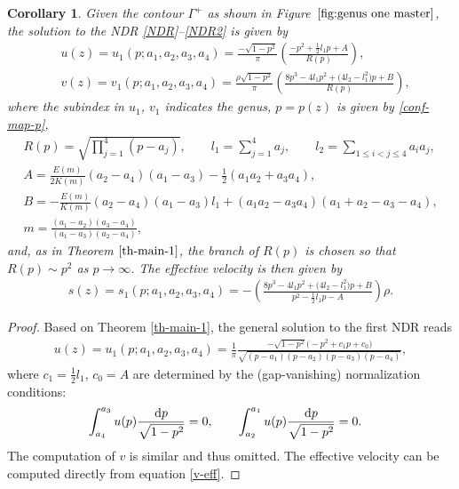 \documentclass[10pt,a4paper]{amsart}
\numberwithin{equation}{section}
\newtheorem{Corollary}[Theorem]{Corollary}
\def\ra{\rightarrow}
\newcommand{\G}{\Gamma}
\def\G{\Gamma}
\begin{document}
\begin{Corollary}
Given the contour $\G^+$ as shown in Figure~$\ref{fig:genus one master}$, the solution to the NDR \eqref{NDR}--\eqref{NDR2} is given by
\begin{align}
&u(z)=u_1(p;a_1,a_2,a_3,a_4)=\frac{-\sqrt{1-p^2}}{\pi}\left(\frac{-p^2+\frac{1}{2}l_1p+A}{R(p)}\right),\label{g1-DOS}\\
&v(z)=v_1(p;a_1,a_2,a_3,a_4)=\frac{\rho\sqrt{1-p^2}}{\pi}\left(\frac{8p^3-4l_1p^2+\bigl(4l_2-l_1^2\bigr)p+B}{R(p)}\right), \label{g1-DOS-v}
\end{align}
where the subindex in $u_1$, $v_1$ indicates the genus, $p=p(z)$ is given by \eqref{conf-map-p},
\begin{gather*}
R(p)=\sqrt{\prod_{j=1}^4(p-a_j)}, \qquad 	l_1=\sum_{j=1}^4a_j, \qquad l_2=\sum_{1\leq i<j\leq 4 }a_ia_j,\\
A=\frac{E(m)}{2K(m)}(a_2-a_4)(a_1-a_3)-\frac{1}{2}(a_1a_2+a_3a_4),\\
B=-\frac{E(m)}{K(m)}(a_2-a_4)(a_1-a_3)l_1+(a_1a_2-a_3a_4)(a_1+a_2-a_3-a_4),\\
m=\frac{(a_1-a_2)(a_3-a_4)}{(a_1-a_3)(a_2-a_4)},
\end{gather*}
and, as in Theorem $\ref{th-main-1}$, the branch of $R(p)$ is chosen so that $R(p)\sim p^2$ as ${p\ra \infty}$.
The effective velocity is then given by
\begin{align}
s(z)=s_1(p;a_1,a_2,a_3,a_4)=-\left(\frac{8p^3-4l_1p^2+\bigl(4l_2-l_1^2\bigr)p+B}{p^2-\frac{1}{2}l_1p-A}\right)\rho.\label{g1-effv}
\end{align}
\end{Corollary}
\begin{proof}
Based on Theorem \ref{th-main-1}, the general solution to the first NDR reads
\begin{align*}
u(z)=u_1(p;a_1,a_2,a_3,a_4)=\frac{1}{\pi}\frac{-\sqrt{1-p^2}\bigl(-p^2+c_1p+c_0\bigr)}{\sqrt{(p-a_1)(p-a_2)(p-a_3)(p-a_4)}},
\end{align*}
where $c_1=\frac{1}{2}l_1$, $c_0=A$ are determined by the (gap-vanishing) normalization conditions:
\begin{align*}
&\int_{a_4}^{a_3}u(p)\frac{{\rm d}p}{\sqrt{1-p^2}}=0,\qquad
\int_{a_2}^{a_1}u(p)\frac{{\rm d}p}{\sqrt{1-p^2}}=0.
\end{align*}
The computation of $v$ is similar and thus omitted. The effective velocity can be computed directly from equation \eqref{v-eff}.
\end{proof}
\end{document}
